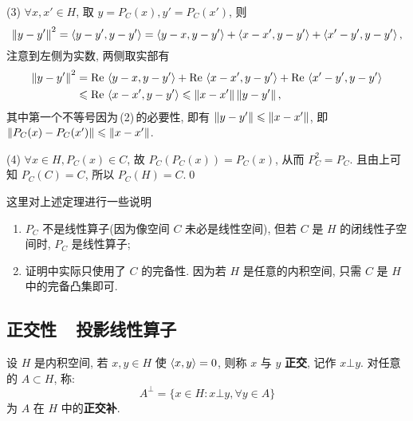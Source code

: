 \begin{Proof}
        (3) $ \forall x, x'\in H $, 取 $ y=P_{C}(x), y'=P_{C}(x') $, 则
        \[
            \left\| y-y' \right\|^{2}=\left\langle y-y', y-y' \right\rangle=\left\langle y-x, y-y' \right\rangle+\left\langle x-x', y-y' \right\rangle+\left\langle x'-y', y-y' \right\rangle,
        \]
        注意到左侧为实数, 两侧取实部有
        \[
            \begin{aligned}
                \left\| y-y' \right\|^{2} & =\mathrm{Re\,}\left\langle y-x, y-y' \right\rangle+\mathrm{Re\,}\left\langle x-x', y-y' \right\rangle+\mathrm{Re\,}\left\langle x'-y', y-y' \right\rangle\\
                & \leqslant \mathrm{Re\,}\left\langle x-x', y-y' \right\rangle\leqslant \left\| x-x' \right\|\left\| y-y' \right\|,
            \end{aligned}
        \]
        其中第一个不等号因为\,(2)\,的必要性, 即有 $ \left\| y-y' \right\|\leqslant\left\| x-x' \right\| $, 即 $ \left\| P_{C}(x)-P_{C}(x') \right\|\leqslant \left\| x-x' \right\| $.
        
        (4) $ \forall x\in H, P_{C}(x)\in C $, 故 $ P_{C}(P_{C}(x))=P_{C}(x) $, 从而 $ P_{C}^{2}=P_{C} $. 且由上可知 $ P_{C}(C)=C $, 所以 $ P_{C}(H)=C $.\qed
    \end{Proof}

    \begin{Remark}
        这里对上述定理进行一些说明
        \begin{enumerate}[(1)]
            \item $ P_{C} $ 不是线性算子(因为像空间 $ C $ 未必是线性空间), 但若 $ C $ 是 $ H $ 的闭线性子空间时, $ P_{C} $ 是线性算子;
            \item 证明中实际只使用了 $ C $ 的完备性. 因为若 $ H $ 是任意的内积空间, 只需 $ C $ 是 $ H $ 中的完备凸集即可.
        \end{enumerate}
    \end{Remark}

    \subsection{正交性\ \ 投影线性算子}

    \begin{Definition}[正交, 正交补]\label{def:正交, 正交补}
         设 $ H $ 是内积空间,  若 $ x, y\in H $ 使 $ \left\langle x, y \right\rangle=0 $, 则称 $ x $ 与 $ y $ \textbf{正交}, 记作 $ x\bot y $. 对任意的 $ A\subset H $, 称:
         \[
            A^{\bot}=\{ x\in H: x\bot y, \forall y\in A \} 
         \]
         为 $ A $ 在 $ H $ 中的\textbf{正交补}.
    \end{Definition}

